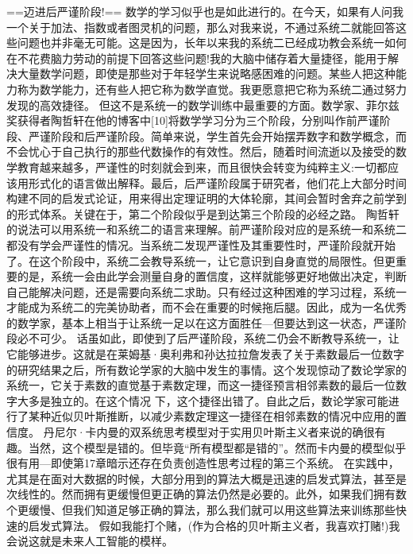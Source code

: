 ==迈进后严谨阶段!==
数学的学习似乎也是如此进行的。在今天，如果有人问我一个关于加法、指数或者图灵机的问题，那么对我来说，不通过系统二就能回答这些问题也并非毫无可能。这是因为，长年以来我的系统二已经成功教会系统一如何在不花费脑力劳动的前提下回答这些问题!我的大脑中储存着大量捷径，能用于解决大量数学问题，即使是那些对于年轻学生来说略感困难的问题。某些人把这种能力称为数学能力，还有些人把它称为数学直觉。我更愿意把它称为系统二通过努力发现的高效捷径。
但这不是系统一的数学训练中最重要的方面。数学家、菲尔兹奖获得者陶哲轩在他的博客中[10]将数学学习分为三个阶段，分别叫作前严谨阶段、严谨阶段和后严谨阶段。简单来说，学生首先会开始摆弄数字和数学概念，而不会忧心于自己执行的那些代数操作的有效性。然后，随着时间流逝以及接受的数学教育越来越多，严谨性的时刻就会到来，而且很快会转变为纯粹主义:一切都应该用形式化的语言做出解释。最后，后严谨阶段属于研究者，他们花上大部分时间构建不同的启发式论证，用来得出定理证明的大体轮廓，其间会暂时舍弃之前学到的形式体系。关键在于，第二个阶段似乎是到达第三个阶段的必经之路。
陶哲轩的说法可以用系统一和系统二的语言来理解。前严谨阶段对应的是系统一和系统二都没有学会严谨性的情况。当系统二发现严谨性及其重要性时，严谨阶段就开始了。在这个阶段中，系统二会教导系统一，让它意识到自身直觉的局限性。但更重要的是，系统一会由此学会测量自身的置信度，这样就能够更好地做出决定，判断自己能解决问题，还是需要向系统二求助。只有经过这种困难的学习过程，系统一才能成为系统二的完美协助者，而不会在重要的时候拖后腿。因此，成为一名优秀的数学家，基本上相当于让系统一足以在这方面胜任---但要达到这一状态，严谨阶段必不可少。
话虽如此，即使到了后严谨阶段，系统二仍会不断教导系统一，让它能够进步。这就是在莱姆基·奥利弗和孙达拉拉詹发表了关于素数最后一位数字的研究结果之后，所有数论学家的大脑中发生的事情。这个发现惊动了数论学家的系统一，它关于素数的直觉基于素数定理，而这一捷径预言相邻素数的最后一位数字大多是独立的。在这个情况
下，这个捷径出错了。自此之后，数论学家可能进行了某种近似贝叶斯推断，以减少素数定理这一捷径在相邻素数的情况中应用的置信度。
丹尼尔·卡内曼的双系统思考模型对于实用贝叶斯主义者来说的确很有趣。当然，这个模型是错的。但毕竟“所有模型都是错的”。然而卡内曼的模型似乎很有用---即使第17章暗示还存在负责创造性思考过程的第三个系统。
在实践中，尤其是在面对大数据的时候，大部分用到的算法大概是迅速的启发式算法，甚至是次线性的。然而拥有更缓慢但更正确的算法仍然是必要的。此外，如果我们拥有数个更缓慢、但我们知道足够正确的算法，那么我们就可以用这些算法来训练那些快速的启发式算法。
假如我能打个赌，(作为合格的贝叶斯主义者，我喜欢打赌!)我会说这就是未来人工智能的模样。